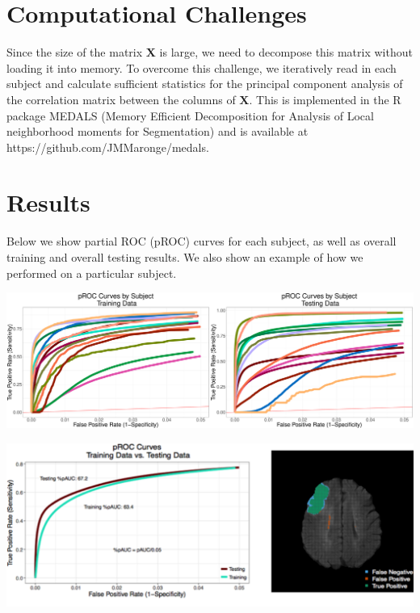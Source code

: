 \documentclass[a0,landscape]{a0poster}
\begin{document}
\begin{multicols}{3}
\large{\section*{\color{uwred}Computational Challenges}}
\hspace{1cm}Since the size of the matrix $\mathbf{X}$ is large, we need to decompose this matrix without loading it into memory. To overcome this challenge, we iteratively read in each subject and calculate sufficient statistics for the principal component analysis of the correlation matrix between the columns of $\mathbf{X}$. This is implemented in the R package MEDALS (Memory Efficient Decomposition for Analysis of Local neighborhood moments for Segmentation) and is available at https://github.com/JMMaronge/medals.
\vspace{.5cm}

\large{\section*{\color{uwred}Results}}
\hspace{1cm}Below we show partial ROC (pROC) curves for each subject, as well as overall training and overall testing results. We also show an example of how we performed on a particular subject.

\begin{center}\vspace{.5cm}
\includegraphics[width=1\linewidth]{procbysubject.pdf}
\end{center}\vspace{.5cm}

\begin{center}\vspace{.5cm}
\includegraphics[width=1\linewidth]{bothplots.pdf}
\end{center}\vspace{.5cm}


\end{multicols}
\end{document}
